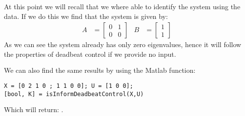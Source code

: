 At this point we will recall that we where able to identify the system using the data. If we do this we find that the system is given by:
\begin{align*}
A &= \begin{bmatrix}0&1\\0&0\end{bmatrix} & B &= \begin{bmatrix}1\\1\end{bmatrix}
\end{align*}
As we can see the system already has only zero eigenvalues, hence it will follow the properties of deadbeat control if we provide no input.

We can also find the same results by using the Matlab function:
\begin{lstlisting}
X = [0 2 1 0 ; 1 1 0 0]; U = [1 0 0];
[bool, K] = isInformDeadbeatControl(X,U)
\end{lstlisting}
Which will return: \mon{[ 1, [0.5329e-14 -0.6217e-14] ]}.










